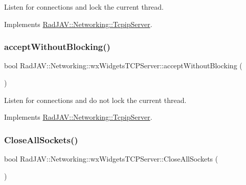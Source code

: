 Listen for connections and lock the current thread. 

Implements \mbox{\hyperlink{class_rad_j_a_v_1_1_networking_1_1_tcpip_server_a53555ae267a5f3d6ac8aafbb7a567ee9}{Rad\+J\+A\+V\+::\+Networking\+::\+Tcpip\+Server}}.

\mbox{\label{class_rad_j_a_v_1_1_networking_1_1wx_widgets_t_c_p_server_a1e78417fa012bebbc21fbcf8557c8008}} 
\subsubsection{\texorpdfstring{accept\+Without\+Blocking()}{acceptWithoutBlocking()}}
{\footnotesize\ttfamily bool Rad\+J\+A\+V\+::\+Networking\+::wx\+Widgets\+T\+C\+P\+Server\+::accept\+Without\+Blocking (\begin{DoxyParamCaption}{ }\end{DoxyParamCaption})\hspace{0.3cm}{\ttfamily [virtual]}}

Listen for connections and do not lock the current thread. 

Implements \mbox{\hyperlink{class_rad_j_a_v_1_1_networking_1_1_tcpip_server_a3d7ea19180509cffa6d4ee802767ca90}{Rad\+J\+A\+V\+::\+Networking\+::\+Tcpip\+Server}}.

\mbox{\label{class_rad_j_a_v_1_1_networking_1_1wx_widgets_t_c_p_server_a83718025ada3888b0cb3eab89ab9e97f}} 
\subsubsection{\texorpdfstring{Close\+All\+Sockets()}{CloseAllSockets()}}
{\footnotesize\ttfamily bool Rad\+J\+A\+V\+::\+Networking\+::wx\+Widgets\+T\+C\+P\+Server\+::\+Close\+All\+Sockets (\begin{DoxyParamCaption}{ }\end{DoxyParamCaption})}


